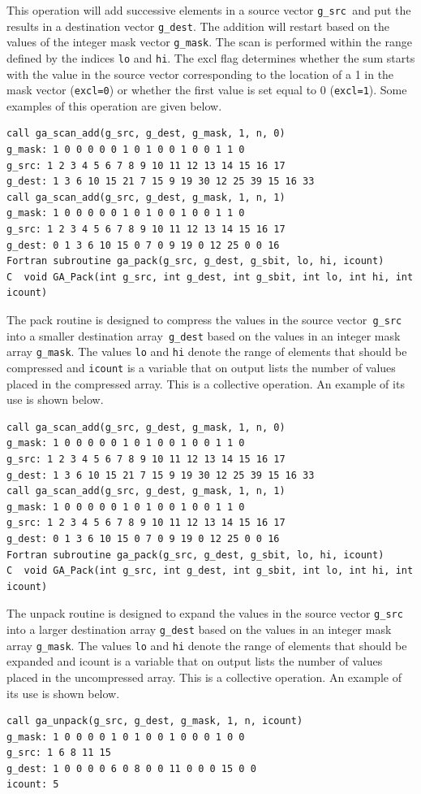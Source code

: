 \noindent This operation will add successive elements in a source vector \texttt{g\_src
}and put the results in a destination vector \texttt{g\_dest}. The
addition will restart based on the values of the integer mask vector
\texttt{g\_mask}. The scan is performed within the range defined by
the indices \texttt{lo} and \texttt{hi}. The excl flag determines
whether the sum starts with the value in the source vector corresponding
to the location of a 1 in the mask vector (\texttt{excl=0}) or whether
the first value is set equal to 0 (\texttt{excl=1}). Some examples
of this operation are given below.
\begin{lstlisting}[style=cppnoframe]
call ga_scan_add(g_src, g_dest, g_mask, 1, n, 0)
g_mask: 1 0 0 0 0 0 1 0 1 0 0 1 0 0 1 1 0
g_src: 1 2 3 4 5 6 7 8 9 10 11 12 13 14 15 16 17
g_dest: 1 3 6 10 15 21 7 15 9 19 30 12 25 39 15 16 33
call ga_scan_add(g_src, g_dest, g_mask, 1, n, 1)
g_mask: 1 0 0 0 0 0 1 0 1 0 0 1 0 0 1 1 0
g_src: 1 2 3 4 5 6 7 8 9 10 11 12 13 14 15 16 17
g_dest: 0 1 3 6 10 15 0 7 0 9 19 0 12 25 0 0 16
Fortran subroutine ga_pack(g_src, g_dest, g_sbit, lo, hi, icount)
C  void GA_Pack(int g_src, int g_dest, int g_sbit, int lo, int hi, int icount)
\end{lstlisting}

The pack routine is designed to compress the values in the source
vector\texttt{ g\_src} into a smaller destination array\texttt{ g\_dest}
based on the values in an integer mask array \texttt{g\_mask}. The
values \texttt{lo} and \texttt{hi} denote the range of elements that
should be compressed and \texttt{icount} is a variable that on output
lists the number of values placed in the compressed array. This is
a collective operation. An example of its use is shown below.
\begin{lstlisting}[style=cppnoframe]
call ga_scan_add(g_src, g_dest, g_mask, 1, n, 0)
g_mask: 1 0 0 0 0 0 1 0 1 0 0 1 0 0 1 1 0
g_src: 1 2 3 4 5 6 7 8 9 10 11 12 13 14 15 16 17
g_dest: 1 3 6 10 15 21 7 15 9 19 30 12 25 39 15 16 33
call ga_scan_add(g_src, g_dest, g_mask, 1, n, 1)
g_mask: 1 0 0 0 0 0 1 0 1 0 0 1 0 0 1 1 0
g_src: 1 2 3 4 5 6 7 8 9 10 11 12 13 14 15 16 17
g_dest: 0 1 3 6 10 15 0 7 0 9 19 0 12 25 0 0 16
Fortran subroutine ga_pack(g_src, g_dest, g_sbit, lo, hi, icount)
C  void GA_Pack(int g_src, int g_dest, int g_sbit, int lo, int hi, int icount)
\end{lstlisting}

The unpack routine is designed to expand the values in the source
vector \texttt{g\_src} into a larger destination array \texttt{g\_dest}
based on the values in an integer mask array \texttt{g\_mask}. The
values \texttt{lo} and \texttt{hi} denote the range of elements that
should be expanded and icount is a variable that on output lists the
number of values placed in the uncompressed array. This is a collective
operation. An example of its use is shown below.
\begin{lstlisting}[style=cppnoframe]
call ga_unpack(g_src, g_dest, g_mask, 1, n, icount)
g_mask: 1 0 0 0 0 1 0 1 0 0 1 0 0 0 1 0 0
g_src: 1 6 8 11 15
g_dest: 1 0 0 0 0 6 0 8 0 0 11 0 0 0 15 0 0
icount: 5
\end{lstlisting}

